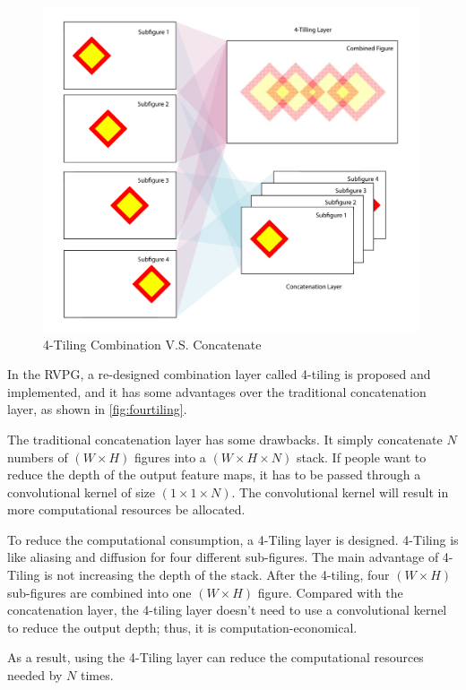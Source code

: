 \begin{spacing}{1.5}
\begin{figure}[ht]
\centering
\includegraphics[width=0.99\textwidth, fbox]{Chapter3/fourtiling.pdf}
\caption{4-Tiling Combination V.S. Concatenate}
\label{fig:fourtiling} 
\end{figure}

In the RVPG, a re-designed combination layer called 4-tiling is proposed and implemented, and it has some advantages over the traditional concatenation layer, as shown in \autoref{fig:fourtiling}.

The traditional concatenation layer has some drawbacks. It simply concatenate $N$ numbers of $(W \times H)$ figures into a $(W \times H \times N)$ stack. If people want to reduce the depth of the output feature maps, it has to be passed through a convolutional kernel of size $(1 \times 1 \times N)$. The convolutional kernel will result in more computational resources be allocated.

To reduce the computational consumption, a 4-Tiling layer is designed. 4-Tiling is like aliasing and diffusion for four different sub-figures. The main advantage of 4-Tiling is not increasing the depth of the stack. After the 4-tiling, four $(W \times H)$ sub-figures are combined into one $(W \times H)$ figure. Compared with the concatenation layer, the 4-tiling layer doesn't need to use a convolutional kernel to reduce the output depth; thus, it is computation-economical.

As a result, using the 4-Tiling layer can reduce the computational resources needed by $N$ times.


\end{spacing}
